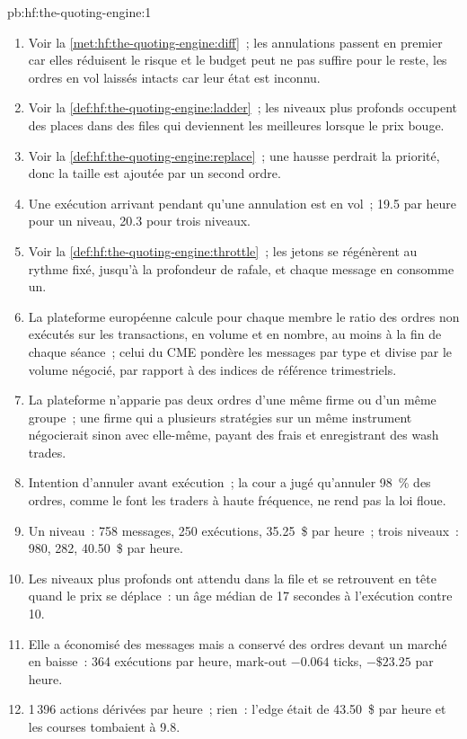 \begin{solution}{pb:hf:the-quoting-engine:1}
\begin{enumerate}
\item Voir la \cref{met:hf:the-quoting-engine:diff}~; les annulations passent en premier car elles réduisent le risque et le budget peut ne pas suffire pour le reste, les ordres en vol
laissés intacts car leur état est inconnu.
\item Voir la \cref{def:hf:the-quoting-engine:ladder}~; les niveaux plus profonds occupent des places dans des files qui deviennent les meilleures lorsque le prix bouge.
\item Voir la \cref{def:hf:the-quoting-engine:replace}~; une hausse perdrait la priorité, donc la taille est ajoutée par un second ordre.
\item Une exécution arrivant pendant qu'une annulation est en vol~; 19.5 par heure pour un niveau, 20.3 pour trois niveaux.
\item Voir la \cref{def:hf:the-quoting-engine:throttle}~; les jetons se régénèrent au rythme fixé, jusqu'à la profondeur de rafale, et chaque message en consomme un.
\item La plateforme européenne calcule pour chaque membre le ratio des ordres non exécutés sur les transactions, en volume et en nombre, au moins à la fin de chaque séance~;
celui du CME pondère les messages par type et divise par le volume négocié, par rapport à des indices de référence trimestriels.
\item La plateforme n'apparie pas deux ordres d'une même firme ou d'un même groupe~; une firme qui a plusieurs stratégies sur un même instrument négocierait sinon avec elle-même,
payant des frais et enregistrant des wash trades.
\item Intention d'annuler avant exécution~; la cour a jugé qu'annuler 98~\% des ordres, comme le font les traders à haute fréquence, ne rend pas la
loi floue.
\item Un niveau~: 758 messages, 250 exécutions, 35.25~\$ par heure~; trois niveaux~: 980, 282, 40.50~\$ par heure.
\item Les niveaux plus profonds ont attendu dans la file et se retrouvent en tête quand le prix se déplace~: un âge médian de 17 secondes à l'exécution contre 10.
\item Elle a économisé des messages mais a conservé des ordres devant un marché en baisse~: 364 exécutions par heure, mark-out $-0.064$ ticks, $-\$23.25$ par heure.
\item 1\,396 actions dérivées par heure~; rien~: l'edge était de 43.50~\$ par heure et les courses tombaient à 9.8.

\end{enumerate}
\end{solution}
